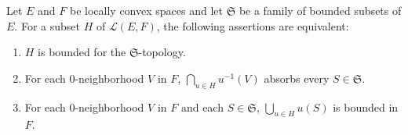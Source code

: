 Let \(E\) and \(F\) be locally convex spaces and let \(\mathfrak{S}\) be a family of bounded subsets of \(E\). For a subset \(H\) of \(\mathcal{L}(E, F)\), the following assertions are equivalent:
\begin{enumerate}
\item[(a)] \(H\) is bounded for the \(\mathfrak{S}\)-topology.
\item[(b)] For each \(0\)-neighborhood \(V\) in \(F\), \(\bigcap_{u \in H} u^{-1}(V)\) absorbs every \(S \in \mathfrak{S}\).
\item[(c)] For each \(0\)-neighborhood \(V\) in \(F\) and each \(S \in \mathfrak{S}\), \(\bigcup_{u \in H} u(S)\) is bounded in \(F\).
\end{enumerate}
